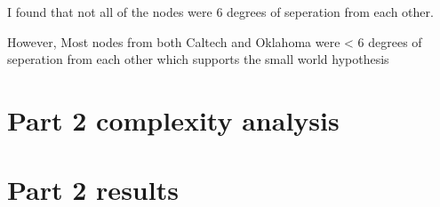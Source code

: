 \documentclass{article}
\begin{document}
I found that not all of the nodes were 6 degrees of seperation from each other.

However, Most nodes from both Caltech and Oklahoma were < 6 degrees of 
seperation from each other which supports the small world hypothesis


\section{Part 2 complexity analysis}
\label{sec:complexity2}


\section{Part 2 results}
\label{sec:part2}
\end{document}

